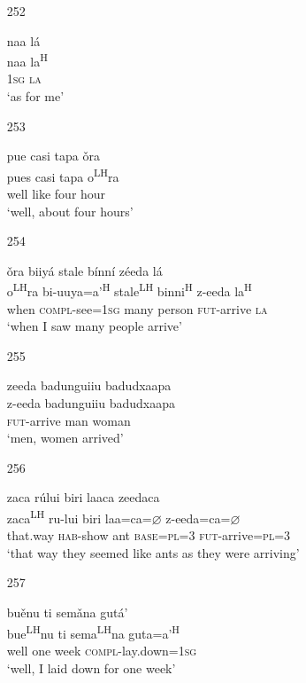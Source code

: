 \begin{itemize}
\item[252]
 
\glll   naa l\'{a} \\
 naa la\textsuperscript{H}\\
 \textsc{1sg} \textsc{la}\\
\glt `as for me'
 


\item[253]
 
\glll   pue casi tapa \v{o}ra  \\
pues casi tapa o\textsuperscript{LH}ra\\
 well like four hour\\
\glt `well, about four hours'
 


\item[254]
 
\glll   \v{o}ra biiy\'{a} stale b\'{i}nn\'{i} z\'{e}eda l\'{a}\\
o\textsuperscript{LH}ra bi-uuya=a'\textsuperscript{H} stale\textsuperscript{LH} binni\textsuperscript{H} z-eeda la\textsuperscript{H}\\
when \textsc{compl}-see=\textsc{1sg} many person \textsc{fut}-arrive \textsc{la}\\
\glt `when I saw many people arrive'
 


\item[255]
 
\glll   zeeda badunguiiu badudxaapa\\
z-eeda badunguiiu badudxaapa\\
\textsc{fut}-arrive man woman\\
\glt `men, women arrived' 
 


\item[256]
 
\glll   zaca r\'{u}lui biri laaca zeedaca\\
zaca\textsuperscript{LH} ru-lui biri laa=ca=$\varnothing$ z-eeda=ca=$\varnothing$\\
that.way \textsc{hab}-show ant \textsc{base}=\textsc{pl}=\textsc{3} \textsc{fut}-arrive=\textsc{pl}=\textsc{3}\\
\glt `that way they seemed like ants as they were arriving'
 


\item[257]
 
\glll   bu\v{e}nu ti sem\v{a}na gut\'{a}'\\
 bue\textsuperscript{LH}nu ti sema\textsuperscript{LH}na guta=a'\textsuperscript{H}\\
 well one week \textsc{compl}-lay.down=\textsc{1sg}\\
\glt `well, I laid down for one week'
 


\end{itemize}
